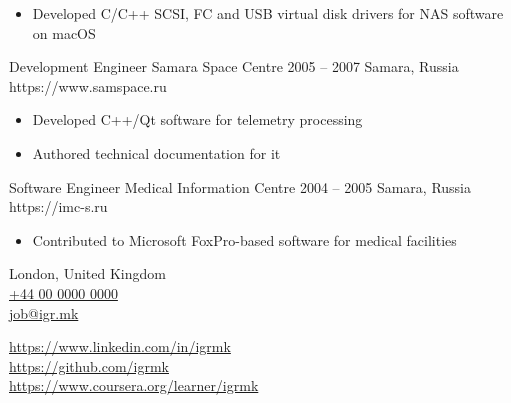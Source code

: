 \documentclass[9pt,a4paper]{juicv}
\newcommand{\myphone}{\href{tel:+440000000000}{+44 00 0000 0000}}
\begin{document}
\begin{paracol}{2}
        \begin{itemize}
            \item Developed C/C++ SCSI, FC and USB virtual disk drivers for NAS software on macOS
        \end{itemize}

    \cvLeftEvent
        {Development Engineer}
        {Samara Space Centre}
        {2005 -- 2007}
        {Samara, Russia}
        {https://www.samspace.ru}

        \begin{itemize}
            \item Developed C++/Qt software for telemetry processing
            \item Authored technical documentation for it
        \end{itemize}

    \cvLeftEvent
        {Software Engineer}
        {Medical Information Centre}
        {2004 -- 2005}
        {Samara, Russia}
        {https://imc-s.ru}

        \begin{itemize}
            \item Contributed to Microsoft FoxPro-based software for medical facilities
        \end{itemize}

\newpage
\switchcolumn

    London, United Kingdom\\
    \myphone\\
    \href{mailto:job@igr.mk}{job@igr.mk}

    \vspace{6pt}
    {
        \small
        \href{https://www.linkedin.com/in/igrmk}{https://www.linkedin.com/in/igrmk}\\
        \href{https://github.com/igrmk}{https://github.com/igrmk}\\
        \href{https://www.coursera.org/learner/igrmk}{https://www.coursera.org/learner/igrmk}
        \par
    }



\end{paracol}
\end{document}
